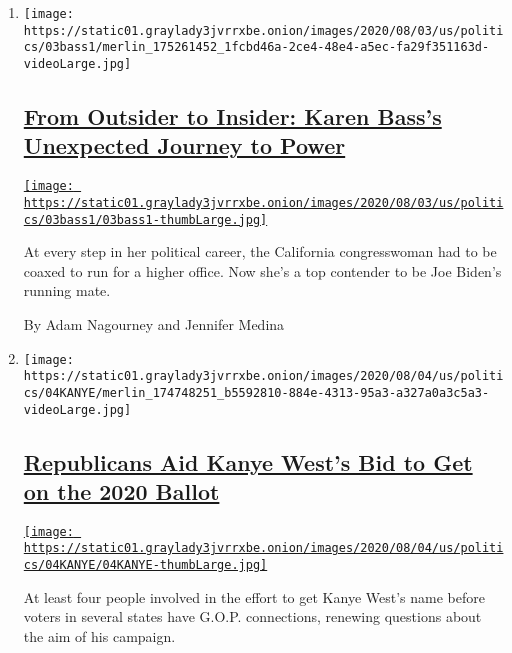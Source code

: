 \begin{enumerate}
\def\labelenumi{\arabic{enumi}.}
\item
  \texttt{[image: https://static01.graylady3jvrrxbe.onion/images/2020/08/03/us/politics/03bass1/merlin\_175261452\_1fcbd46a-2ce4-48e4-a5ec-fa29f351163d-videoLarge.jpg]}

  \hypertarget{from-outsider-to-insider-karen-basss-unexpected-journey-to-power}{%
  \subsection{\texorpdfstring{\href{/2020/08/04/us/politics/karen-bass-vice-president-biden.html}{From
  Outsider to Insider: Karen Bass's Unexpected Journey to
  Power}}{From Outsider to Insider: Karen Bass's Unexpected Journey to Power}}\label{from-outsider-to-insider-karen-basss-unexpected-journey-to-power}}

  \href{/2020/08/04/us/politics/karen-bass-vice-president-biden.html}{\texttt{[image: https://static01.graylady3jvrrxbe.onion/images/2020/08/03/us/politics/03bass1/03bass1-thumbLarge.jpg]}}

  At every step in her political career, the California congresswoman
  had to be coaxed to run for a higher office. Now she's a top contender
  to be Joe Biden's running mate.

  By Adam Nagourney and Jennifer Medina
\item
  \texttt{[image: https://static01.graylady3jvrrxbe.onion/images/2020/08/04/us/politics/04KANYE/merlin\_174748251\_b5592810-884e-4313-95a3-a327a0a3c5a3-videoLarge.jpg]}

  \hypertarget{republicans-aid-kanye-wests-bid-to-get-on-the-2020-ballot}{%
  \subsection{\texorpdfstring{\href{/2020/08/04/us/politics/kanye-west-president-republicans.html}{Republicans
  Aid Kanye West's Bid to Get on the 2020
  Ballot}}{Republicans Aid Kanye West's Bid to Get on the 2020 Ballot}}\label{republicans-aid-kanye-wests-bid-to-get-on-the-2020-ballot}}

  \href{/2020/08/04/us/politics/kanye-west-president-republicans.html}{\texttt{[image: https://static01.graylady3jvrrxbe.onion/images/2020/08/04/us/politics/04KANYE/04KANYE-thumbLarge.jpg]}}

  At least four people involved in the effort to get Kanye West's name
  before voters in several states have G.O.P. connections, renewing
  questions about the aim of his campaign.
\end{enumerate}

